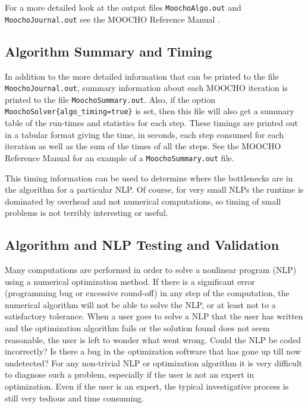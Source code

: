\documentclass[pdf,12pt,report]{SANDreport}
\begin{document}
For a more detailed look at the output files {}\texttt{Moocho\-Algo.out} and
{}\texttt{Moocho\-Journal.out} see the MOOCHO Reference Manual
{}\cite{ref:moochorefguide}.

%
\subsection{Algorithm Summary and Timing}
%

In addition to the more detailed information that can be printed to the file
{}\texttt{Moocho\-Journal.out}, summary information about each MOOCHO
iteration is printed to the file {}\texttt{Moocho\-Summary.out}.  Also, if the
option {}\texttt{Moocho\-Solver\{\-algo\_timing\-=true\-\}} is set, then this
file will also get a summary table of the run-times and statistics for each
step.  These timings are printed out in a tabular format giving the time, in
seconds, each step consumed for each iteration as well as the sum of the times
of all the steps.  See the MOOCHO Reference Manual {}\cite{ref:moochorefguide}
for an example of a {}\texttt{Moocho\-Summary.out} file.

This timing information can be used to determine where the bottlenecks are in
the algorithm for a particular NLP.  Of course, for very small NLPs the
runtime is dominated by overhead and not numerical computations, so timing of
small problems is not terribly interesting or useful.

%
\subsection{Algorithm and NLP Testing and Validation}
\label{moocho:sec:testing_and_validation}
%

Many computations are performed in order to solve a nonlinear program (NLP)
using a numerical optimization method.  If there is a significant error
(programming bug or excessive round-off) in any step of the computation, the
numerical algorithm will not be able to solve the NLP, or at least not to a
satisfactory tolerance.  When a user goes to solve a NLP that the user has
written and the optimization algorithm fails or the solution found does not
seem reasonable, the user is left to wonder what went wrong.  Could the NLP be
coded incorrectly?  Is there a bug in the optimization software that has gone
up till now undetected?  For any non-trivial NLP or optimization algorithm it
is very difficult to diagnose such a problem, especially if the user is not an
expert in optimization.  Even if the user is an expert, the typical
investigative process is still very tedious and time consuming.
\end{document}
